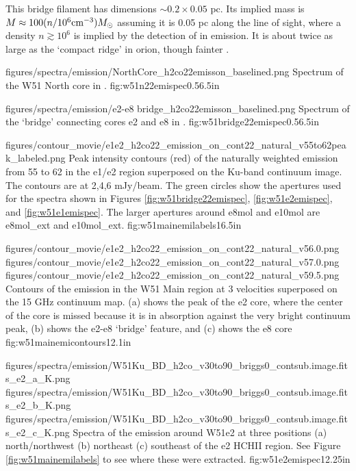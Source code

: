 This bridge filament has dimensions $\sim0.2\times0.05$ pc.  Its implied mass
is $M\approx100 (n/10^6 \textrm{cm}^{-3}) M_{\odot}$ assuming it is 0.05 pc along the line of
sight, where a density $n\gtrsim10^6$ is implied by the detection of
\formaldehyde \twotwo in emission.  It is about twice as large as the `compact
ridge' in orion, though fainter \citep{Mangum1990a,Mangum1993b}.

\Figure
{{figures/spectra/emission/NorthCore_h2co22emisson_baselined}.png}
{Spectrum of the W51 North core in \ortho \twotwo.}
{fig:w51n22emispec}{0.5}{6.5in}

\Figure
{{figures/spectra/emission/e2-e8 bridge_h2co22emisson_baselined}.png}
{Spectrum of the `bridge' connecting cores e2 and e8 in \ortho \twotwo.
}
{fig:w51bridge22emispec}{0.5}{6.5in}

\Figure
{figures/contour_movie/e1e2_h2co22_emission_on_cont22_natural_v55to62peak_labeled.png}
{ Peak intensity contours (red) of the naturally weighted \formaldehyde \twotwo
emission from 55 to 62 \kms in the e1/e2 region superposed on the Ku-band
continuum image.  The contours are at 2,4,6 mJy/beam.  The green circles show
the apertures used for the spectra shown in Figures
\ref{fig:w51bridge22emispec}, \ref{fig:w51e2emispec}, and
\ref{fig:w51e1emispec}.  The larger apertures around e8mol and e10mol are
e8mol\_ext and e10mol\_ext.
}{fig:w51mainemilabels}{1}{6.5in}

\FigureThreeAA
{figures/contour_movie/e1e2_h2co22_emission_on_cont22_natural_v56.0.png}
{figures/contour_movie/e1e2_h2co22_emission_on_cont22_natural_v57.0.png}
{figures/contour_movie/e1e2_h2co22_emission_on_cont22_natural_v59.5.png}
{Contours of the \formaldehyde \twotwo emission in the W51 Main region at 3
velocities superposed on the 15 GHz continuum map.  (a) shows the peak of the e2
core, where the center of the core is missed because it is in absorption
against the very bright continuum peak, (b) shows the e2-e8 `bridge' feature,
and (c) shows the e8 core}
{fig:w51mainemicontours}{1}{2.1in}

\FigureThreeAA
{figures/spectra/emission/W51Ku_BD_h2co_v30to90_briggs0_contsub.image.fits_e2_a_K.png}
{figures/spectra/emission/W51Ku_BD_h2co_v30to90_briggs0_contsub.image.fits_e2_b_K.png}
{figures/spectra/emission/W51Ku_BD_h2co_v30to90_briggs0_contsub.image.fits_e2_c_K.png}
{Spectra of the \twotwo emission around W51e2 at three positions (a)
north/northwest (b) northeast (c) southeast of the e2 HCHII region.  See Figure
\ref{fig:w51mainemilabels} to see where these were extracted.}
{fig:w51e2emispec}{1}{2.25in}

